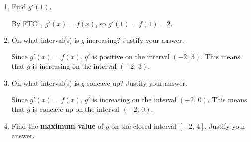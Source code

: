 \documentclass{article}
\begin{document}
\begin{enumerate}
\begin{enumerate}
\begin{solution}
          Similarly,
          \begin{align*}
              g(4)&=\int_1^4f(t)\,dt \\[4pt]
              &= 1.5
          \end{align*}
          which we also figure out by looking at the signed area under the graph of $f$.
          
      \end{solution}
     
     \item 
     \begin{problem}
     Find $g'(1)$.
     \end{problem}
     \pspace{\vfill}

     \begin{solution}
         By FTC1, $g'(x)=f(x)$, so $g'(1)=f(1)=2$.
     \end{solution}
     
     \item 
     \begin{problem}
     On what interval(s) is $g$ increasing? Justify your answer.
     \end{problem}
     \pspace{\vfill}

     \begin{solution}
         Since $g'(x)=f(x)$, $g'$ is positive on the interval $(-2,\,3)$. This means that $g$ is increasing on the interval $(-2,\,3 )$. 
     \end{solution}
     
     \item 
     \begin{problem}
     On what interval(s) is $g$ concave up? Justify your answer.
     \end{problem}
     \pspace{\vfill}

     \begin{solution}
         Since $g'(x)=f(x)$, $g'$ is increasing on the interval $(-2,\,0)$. This means that $g$ is concave up on the interval $(-2,\,0)$.
     \end{solution}
     
     \item 
     \begin{problem}
     Find the \textbf{maximum value} of $g$ on the closed interval $[-2,\,4]$. Justify your answer.
     \end{problem}
     \pspace{\vfill}

     \begin{solution}
     

\end{solution}
\end{enumerate}
\end{enumerate}
\end{document}
